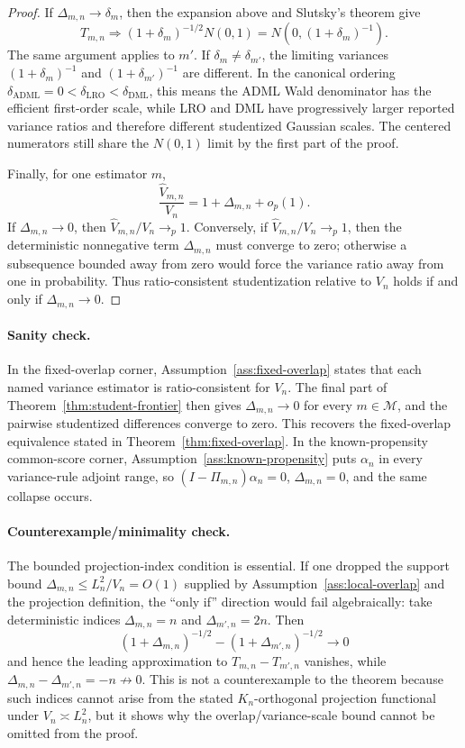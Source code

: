 \begin{proof}
If \(\Delta_{m,n}\to\delta_m\), then the expansion above and Slutsky's theorem
give
\[
  T_{m,n}
  \Rightarrow
  (1+\delta_m)^{-1/2}N(0,1)
  =
  N(0,(1+\delta_m)^{-1}).
\]
The same argument applies to \(m'\).  If \(\delta_m\ne\delta_{m'}\), the
limiting variances \((1+\delta_m)^{-1}\) and \((1+\delta_{m'})^{-1}\) are
different.  In the canonical ordering
\(\delta_{\mathrm{ADML}}=0<\delta_{\mathrm{LRO}}<\delta_{\mathrm{DML}}\), this
means the ADML Wald denominator has the efficient first-order scale, while
LRO and DML have progressively larger reported variance ratios and therefore
different studentized Gaussian scales.  The centered numerators still share
the \(N(0,1)\) limit by the first part of the proof.

Finally, for one estimator \(m\),
\[
  \frac{\hat V_{m,n}}{V_n}
  =
  1+\Delta_{m,n}+o_p(1).
\]
If \(\Delta_{m,n}\to0\), then \(\hat V_{m,n}/V_n\to_p1\).  Conversely, if
\(\hat V_{m,n}/V_n\to_p1\), then the deterministic nonnegative term
\(\Delta_{m,n}\) must converge to zero; otherwise a subsequence bounded away
from zero would force the variance ratio away from one in probability.  Thus
ratio-consistent studentization relative to \(V_n\) holds if and only if
\(\Delta_{m,n}\to0\).
\end{proof}

\paragraph{Sanity check.}
In the fixed-overlap corner, Assumption~\ref{ass:fixed-overlap} states that
each named variance estimator is ratio-consistent for \(V_n\).  The final part
of Theorem~\ref{thm:student-frontier} then gives
\(\Delta_{m,n}\to0\) for every \(m\in\mathcal M\), and the pairwise
studentized differences converge to zero.  This recovers the fixed-overlap
equivalence stated in Theorem~\ref{thm:fixed-overlap}.  In the known-propensity
common-score corner, Assumption~\ref{ass:known-propensity} puts
\(\alpha_n\) in every variance-rule adjoint range, so
\((I-\Pi_{m,n})\alpha_n=0\), \(\Delta_{m,n}=0\), and the same collapse occurs.

\paragraph{Counterexample/minimality check.}
The bounded projection-index condition is essential.  If one dropped the
support bound \(\Delta_{m,n}\le L_n^2/V_n=O(1)\) supplied by
Assumption~\ref{ass:local-overlap} and the projection definition, the
``only if'' direction would fail algebraically: take deterministic indices
\(\Delta_{m,n}=n\) and \(\Delta_{m',n}=2n\).  Then
\[
  (1+\Delta_{m,n})^{-1/2}
  -(1+\Delta_{m',n})^{-1/2}\to0
\]
and hence the leading approximation to \(T_{m,n}-T_{m',n}\) vanishes, while
\(\Delta_{m,n}-\Delta_{m',n}=-n\not\to0\).  This is not a counterexample to
the theorem because such indices cannot arise from the stated
\(K_n\)-orthogonal projection functional under \(V_n\asymp L_n^2\), but it
shows why the overlap/variance-scale bound cannot be omitted from the proof.
